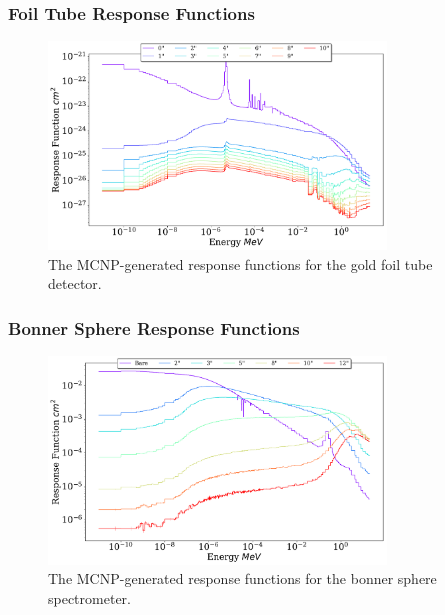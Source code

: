 \documentclass[fleqn]{beamer}
\begin{document}
\begin{frame}
\frametitle{Foil Tube Response Functions}

\begin{figure}
\centering
\includegraphics[width = 0.8\textwidth]{ft_au}
\caption{The MCNP-generated response functions for the gold foil tube detector.}
\end{figure}

\end{frame}

\begin{frame}
\frametitle{Bonner Sphere Response Functions}

\begin{figure}
\centering
\includegraphics[width = 0.8\textwidth]{bs}
\caption{The MCNP-generated response functions for the bonner sphere spectrometer.}
\end{figure}

\end{frame}
\end{document}
